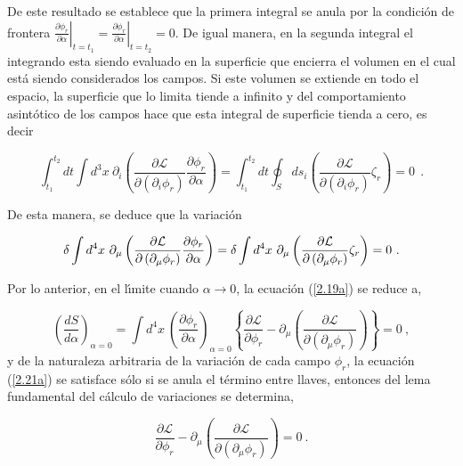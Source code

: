 De este resultado se establece que la primera integral se anula por la
condici\'{o}n de frontera $\left. \frac{\partial \phi_{r}}{\partial
\alpha }\right\vert _{t=t_{1}}=\left. \frac{\partial \phi_{r}}{\partial
\alpha }\right\vert _{t=t_{2}}=0$. De igual manera, en la segunda integral
el integrando esta siendo evaluado en la superficie que encierra el volumen en el cual est\'{a} siendo considerados los campos. Si este volumen se extiende en todo el espacio, la superficie que lo limita tiende a infinito y del comportamiento asint\'{o}tico de los campos hace que esta integral de superficie tienda a cero, es decir

\begin{equation*}
\int_{t_{1}}^{t_{2}}dt\int d^{3}x~\partial _{i}\left( \frac{\partial \mathcal{L}}{\partial \left( \partial _{i}\phi_{r}\right) }\frac{\partial\phi_{r}}{\partial \alpha }\right)=\int_{t_{1}}^{t_{2}}dt\oint_{S}ds_{i}\left(\frac{\partial \mathcal{L}}{\partial \left( \partial _{i}\phi_{r}\right) }\zeta_{r}\right) =0~\  .
\end{equation*}

\noindent
De esta manera, se deduce que la variaci\'{o}n 

\begin{equation}
\delta \int d^{4}x\ \partial _{\mu }\left( \frac{\partial \mathcal{L}}{%
\partial \left( \partial _{\mu }\phi_{r}\right) }\frac{\partial \phi
_{r}}{\partial \alpha }\right) =\delta \int d^{4}x\ \partial _{\mu
}\left( \frac{\partial \mathcal{L}}{\partial \left( \partial _{\mu }\phi
_{r}\right) }\zeta _{r}\right) =0 ~.  \label{2.21}
\end{equation}

\noindent
Por lo anterior, en el l\'{\i}mite cuando $\alpha \rightarrow 0$, la ecuaci\'{o}n (\ref{2.19a}) se reduce a,

\begin{equation}
\left( \frac{dS}{d\alpha }\right) _{\alpha =0}=\int d^{4}x\ \left( \frac{\partial \phi_{r}}{\partial \alpha }\right) _{\alpha =0}\left\{ \frac{\partial \mathcal{L}}{\partial \phi _{r}}-\partial _{\mu }\left( \frac{\partial \mathcal{L}}{\partial \left( \partial _{\mu }\phi_{r}\right) }\right) \right\} =0~,  \label{2.21a}
\end{equation}
y de la naturaleza arbitraria de la variaci\'{o}n de cada campo $\phi_{r}$, la ecuaci\'{o}n (\ref{2.21a}) se satisface s\'{o}lo si se anula el t\'{e}rmino entre llaves, entonces del lema fundamental del c\'{a}lculo de variaciones se determina,

\begin{equation}
\frac{\partial \mathcal{L}}{\partial \phi_{r}}-\partial _{\mu }\left(\frac{\partial \mathcal{L}}{\partial \left( \partial _{\mu }\phi _{r}\right) }\right) =0~.  \label{2.22}
\end{equation}

